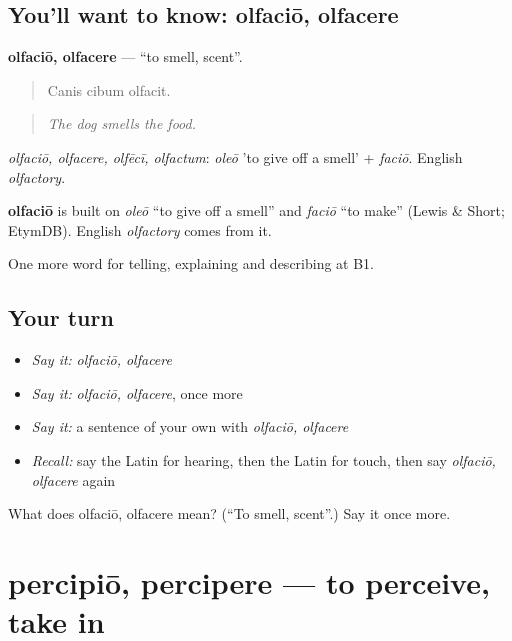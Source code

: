 \subsection*{You'll want to know: olfaciō, olfacere}
\textbf{olfaciō, olfacere} — \textquotedblleft{}to smell, scent\textquotedblright{}.

\begin{quote}
Canis cibum olfacit.
\end{quote}

\begin{quote}
\emph{The dog smells the food.}
\end{quote}

\emph{olfaciō, olfacere, olfēcī, olfactum}: \emph{oleō} 'to give off a smell' + \emph{faciō}. English \emph{olfactory}.

\begin{cousinweb}
\textbf{olfaciō} is built on \emph{oleō} \textquotedblleft{}to give off a smell\textquotedblright{} and \emph{faciō} \textquotedblleft{}to make\textquotedblright{} (Lewis \& Short; EtymDB). English \emph{olfactory} comes from it.
\end{cousinweb}

\begin{grammarlens}[title={What you've built}]
One more word for telling, explaining and describing at B1.
\end{grammarlens}

\subsection*{Your turn}
\begin{itemize}
\raggedright
  \item \emph{Say it:} \emph{olfaciō, olfacere}
  \item \emph{Say it:} \emph{olfaciō, olfacere}, once more
  \item \emph{Say it:} a sentence of your own with \emph{olfaciō, olfacere}
  \item \emph{Recall:} say the Latin for hearing, then the Latin for touch, then say \emph{olfaciō, olfacere} again
\end{itemize}

\begin{tcolorbox}[breakable,colback=teal!4,colframe=teal!35!black,title={Before you move on}]
What does olfaciō, olfacere mean? (\textquotedblleft{}To smell, scent\textquotedblright{}.) Say it once more.
\end{tcolorbox}
\section[percipiō, percipere]{percipiō, percipere — to perceive, take in}

